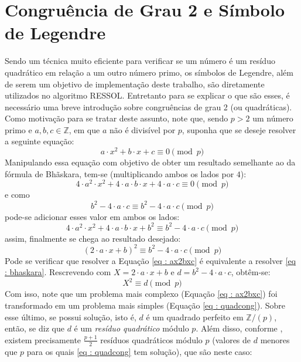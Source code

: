 \section{Congruência de Grau 2 e Símbolo de Legendre}
Sendo um técnica muito eficiente para verificar se um número é um resíduo quadrático em relação a um outro número primo, os símbolos de Legendre, além de serem um objetivo de implementação deste trabalho, são diretamente utilizados no algoritmo RESSOL. Entretanto para se explicar o que são esses, é necessário uma breve introdução sobre congruências de grau 2 (ou quadráticas).
Como motivação para se tratar deste assunto, note que, sendo $p > 2$ um número primo e $a, b, c \in \mathbb{Z}$, em que $a$ não é divisível por $p$, suponha que se deseje resolver a seguinte equação:
\begin{equation} \label{eq : ax2bxc}
    a \cdot x^2 + b \cdot x + c \equiv 0 \pmod p
\end{equation}
Manipulando essa equação com objetivo de obter um resultado semelhante ao da fórmula de Bhãskara, tem-se (multiplicando ambos os lados por $4$):
\begin{equation*}
    4 \cdot a^2 \cdot x^2 + 4 \cdot a \cdot b \cdot x + 4 \cdot a \cdot c \equiv 0 \pmod p
\end{equation*}
e como 
\begin{equation*}
    b^2 - 4 \cdot a \cdot c \equiv b^2 - 4 \cdot a \cdot c \pmod p
\end{equation*}
pode-se adicionar esses valor em ambos os lados:
\begin{equation*}
    4 \cdot a^2 \cdot x^2 + 4 \cdot a \cdot b \cdot x + b^2 \equiv b^2 - 4 \cdot a \cdot c \pmod p
\end{equation*}
assim, finalmente se chega ao resultado desejado:
\begin{equation} \label{eq : bhaskara}
    (2 \cdot a \cdot x + b)^2 \equiv b^2 - 4 \cdot a \cdot c \pmod p
\end{equation}
Pode se verificar que resolver a Equação \ref{eq : ax2bxc}  é equivalente a resolver \ref{eq : bhaskara}. Rescrevendo com $X = 2 \cdot a \cdot x + b$ e $d = b^2 - 4 \cdot a \cdot c$, obtêm-se:
\begin{equation} \label{eq : quadcong}
    X^2 \equiv d \pmod p
\end{equation}
Com isso, note que um problema mais complexo (Equação \ref{eq : ax2bxc}) foi transformado em um problema mais simples (Equação \ref{eq : quadcong}). Sobre esse último, se possui solução, isto é, $d$ é um quadrado perfeito em $\mathbb{Z}/(p)$, então, se diz que $d$ é um \textit{resíduo quadrático} módulo $p$. Além disso, conforme \cite{book:2399854}, existem precisamente $\frac{p+1}{2}$ resíduos quadráticos módulo $p$ (valores de $d$ menores que $p$ para os quais \ref{eq : quadcong} tem solução), que são neste caso:
